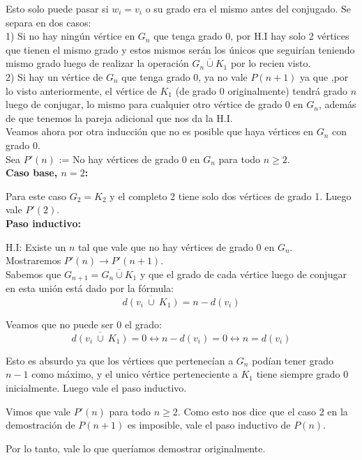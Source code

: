 \documentclass{article}
\begin{document}
Esto solo puede pasar si $w_i = v_i$ o su grado era el mismo antes del conjugado. Se separa en dos casos:\\

1) Si no hay ningún vértice en $G_n$ que tenga grado 0, por H.I hay solo 2 vértices que tienen el mismo grado y estos mismos serán los únicos que seguirían teniendo mismo grado luego de realizar la operación $\overline{G_n \cup K_1}$ por lo recien visto. \\

2) Si hay un vértice de $G_n$ que tenga grado 0, ya no vale $P(n + 1)$ ya que ,por lo visto anteriormente, el vértice de $K_1$ (de grado 0 originalmente) tendrá grado $n$ luego de conjugar, lo mismo para cualquier otro vértice de grado 0 en $G_n$, además de que tenemos la pareja adicional que nos da la H.I.\\

Veamos ahora por otra inducción que no es posible que haya vértices en $G_n$ con grado 0.\\

Sea $P'(n)$ := No hay vértices de grado 0 en $G_n$ para todo $n \geq 2$.\\

\textbf{Caso base, $n = 2$:}

Para este caso $G_2 = K_2$ y el completo 2 tiene solo dos vértices de grado 1. Luego vale $P'(2)$.\\

\textbf{Paso inductivo:}

H.I: Existe un $n$ tal que vale que no hay vértices de grado 0 en $G_n$. \\ 
Mostraremos $P'(n) \rightarrow P'(n+1)$.\\

Sabemos que $G_{n+1} = \overline{G_n \cup K_1}$ y que el grado de cada vértice luego de conjugar en esta unión está dado por la fórmula:
\[ \overline{d(v_i \ \cup\  K_1)} =  n - d(v_i) \]

Veamos que no puede ser 0 el grado:
\[ \overline{d(v_i \ \cup\  K_1)}  = 0 \leftrightarrow n - d(v_i) = 0 \leftrightarrow n = d(v_i) \]

Esto es absurdo ya que los vértices que pertenecían a $G_n$ podían tener grado $n-1$ como máximo, y el unico vértice  perteneciente a $K_1$ tiene siempre grado 0 inicialmente. Luego vale el paso inductivo.

Vimos que vale $P'(n)$ para todo $n \geq 2$. Como esto nos dice que el caso 2 en la demostración de $P(n+1)$ es imposible, vale el paso inductivo de $P(n)$.

Por lo tanto, vale lo que queríamos demostrar originalmente.
\end{document}
